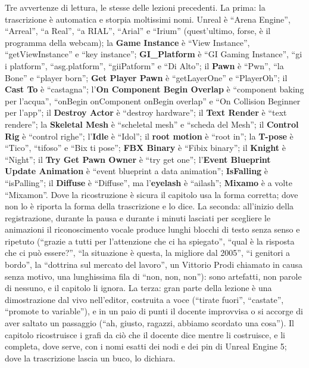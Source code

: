 Tre avvertenze di lettura, le stesse delle lezioni precedenti. La prima: la
trascrizione è automatica e storpia moltissimi nomi. Unreal è ``Arena Engine'',
``Arreal'', ``a Real'', ``a RIAL'', ``Arial'' e ``Irium'' (quest'ultimo, forse, è il
programma della webcam); la \textbf{Game Instance} è ``View Instance'', ``getViewInstance''
e ``key instance''; \textbf{GI\_Platform} è ``GI Gaming Instance'', ``gi i platform'',
``asg.platform'', ``giiPatform'' e ``Di Alto''; il \textbf{Pawn} è ``Pwn'', ``la Bone'' e
``player born''; \textbf{Get Player Pawn} è ``getLayerOne'' e ``PlayerOh''; il
\textbf{Cast To} è ``castagna''; l'\textbf{On Component Begin Overlap} è ``component
baking per l'acqua'', ``onBegin onComponent onBegin overlap'' e ``On Collision Beginner
per l'app''; il \textbf{Destroy Actor} è ``destroy hardware''; il \textbf{Text Render} è
``text rendere''; la \textbf{Skeletal Mesh} è ``scheletal mesh'' e ``scheda del Mesh''; il
\textbf{Control Rig} è ``control righe''; l'\textbf{Idle} è ``Idol''; il \textbf{root
motion} è ``root in''; la \textbf{T-pose} è ``Tico'', ``tifoso'' e ``Bix ti pose'';
\textbf{FBX Binary} è ``Fibix binary''; il \textbf{Knight} è ``Night''; il \textbf{Try Get
Pawn Owner} è ``try get one''; l'\textbf{Event Blueprint Update Animation} è ``event
blueprint a data animation''; \textbf{IsFalling} è ``isPalling''; il \textbf{Diffuse} è
``Diffuse'', ma l'\textbf{eyelash} è ``ailash''; \textbf{Mixamo} è a volte
``Mixamon''. Dove la ricostruzione è sicura il capitolo usa la forma corretta; dove non
lo è riporta la forma della trascrizione e lo dice. La seconda: all'inizio della
registrazione, durante la pausa e durante i minuti lasciati per scegliere le animazioni
il riconoscimento vocale produce lunghi blocchi di testo senza senso e ripetuto
(``grazie a tutti per l'attenzione che ci ha spiegato'', ``qual è la risposta che ci può
essere?'', ``la situazione è questa, la migliore dal 2005'', ``i genitori a bordo'', la
``dottrina sul mercato del lavoro'', un Vittorio Prodi chiamato in causa senza
motivo, una lunghissima fila di ``non, non, non''): sono artefatti, non parole di nessuno,
e il capitolo li ignora. La terza: gran parte della lezione è una dimostrazione dal vivo
nell'editor, costruita a voce (``tirate fuori'', ``castate'', ``promote to variable''),
e in un paio di punti il docente improvvisa o si accorge di aver saltato un passaggio
(``ah, giusto, ragazzi, abbiamo scordato una cosa''). Il capitolo ricostruisce i grafi da
ciò che il docente dice mentre li costruisce, e li completa, dove serve, con i nomi
esatti dei nodi e dei pin di Unreal Engine 5; dove la trascrizione lascia un buco, lo
dichiara.

